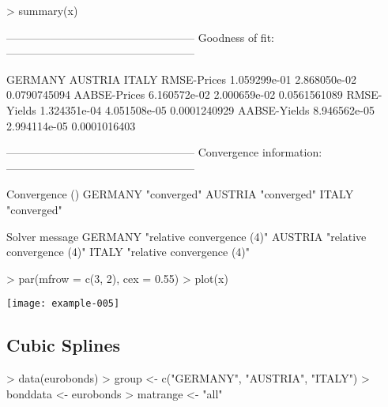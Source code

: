 \begin{Schunk}
\begin{Sinput}
> summary(x)
\end{Sinput}
\begin{Soutput}
---------------------------------------------------
Goodness of fit:
---------------------------------------------------

                  GERMANY      AUSTRIA        ITALY
RMSE-Prices  1.059299e-01 2.868050e-02 0.0790745094
AABSE-Prices 6.160572e-02 2.000659e-02 0.0561561089
RMSE-Yields  1.324351e-04 4.051508e-05 0.0001240929
AABSE-Yields 8.946562e-05 2.994114e-05 0.0001016403


---------------------------------------------------
Convergence information:
---------------------------------------------------

        Convergence ()
GERMANY "converged"   
AUSTRIA "converged"   
ITALY   "converged"   

        Solver message            
GERMANY "relative convergence (4)"
AUSTRIA "relative convergence (4)"
ITALY   "relative convergence (4)"
\end{Soutput}
\end{Schunk}

\begin{center}
\begin{Schunk}
\begin{Sinput}
> par(mfrow = c(3, 2), cex = 0.55)
> plot(x)
\end{Sinput}
\end{Schunk}
\texttt{[image: example-005]}
\end{center}

\subsection{Cubic Splines}

\begin{Schunk}
\begin{Sinput}
> data(eurobonds)
> group <- c("GERMANY", "AUSTRIA", "ITALY")
> bonddata <- eurobonds
> matrange <- "all"
\end{Sinput}
\end{Schunk}

